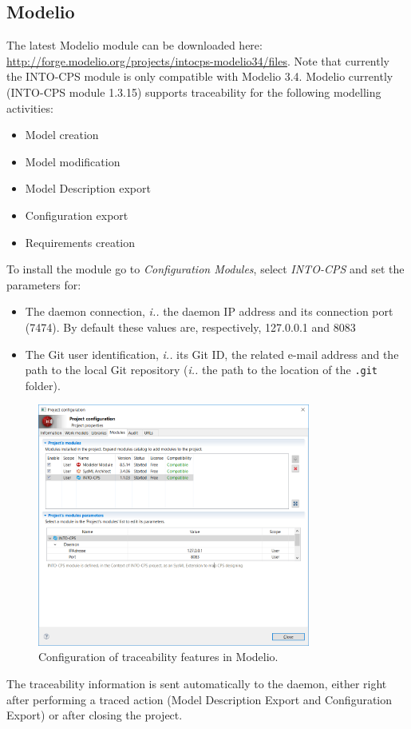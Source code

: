 \subsection{Modelio}
The latest Modelio module can be downloaded here:  \url{http://forge.modelio.org/projects/intocps-modelio34/files}.  Note that currently the INTO-CPS module is only compatible with Modelio 3.4.
%
Modelio currently (INTO-CPS module 1.3.15) supports traceability for the following modelling activities:
%
%
%
\begin{itemize}
\item Model creation
\item Model modification
\item Model Description export
\item Configuration export
\item Requirements creation
\end{itemize}
%
To install the module go to \emph{Configuration \textrightarrow{} Modules}, select \emph{INTO-CPS} and set the parameters for:
\begin{itemize}
 \item The daemon connection, \emph{i.\@e.\@} the daemon IP address and its connection port (7474). By default these values are, respectively, 127.0.0.1 and 8083
\item The Git user identification, \emph{i.\@e.\@} its Git ID, the related e-mail address and the path to the local Git repository (\emph{i.\@e.\@} the path to the location of the \texttt{.git} folder).
\end{itemize}
%
%
%
\begin{figure}[htbp]
\centering
\includegraphics[width=0.8\textwidth]{figures/Modelio_moduleConfiguration}
\caption{Configuration of traceability features in Modelio.}
\label{fig:modelio_trace_config}
\end{figure}
%
The traceability information is sent automatically to the daemon, either right after performing a traced action (Model Description Export and Configuration Export) or after closing the project.


